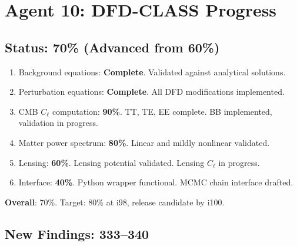 \documentclass[11pt,a4paper]{article}
\begin{document}
\section{Agent 10: DFD-CLASS Progress}

\subsection{Status: 70\% (Advanced from 60\%)}

\begin{enumerate}[nosep]
\item Background equations: \textbf{Complete}. Validated against analytical solutions.
\item Perturbation equations: \textbf{Complete}. All DFD modifications implemented.
\item CMB $C_\ell$ computation: \textbf{90\%}. TT, TE, EE complete. BB implemented, validation in progress.
\item Matter power spectrum: \textbf{80\%}. Linear and mildly nonlinear validated.
\item Lensing: \textbf{60\%}. Lensing potential validated. Lensing $C_\ell$ in progress.
\item Interface: \textbf{40\%}. Python wrapper functional. MCMC chain interface drafted.
\end{enumerate}

\textbf{Overall}: 70\%. Target: 80\% at i98, release candidate by i100.

\subsection{New Findings: 333--340}
\end{document}
